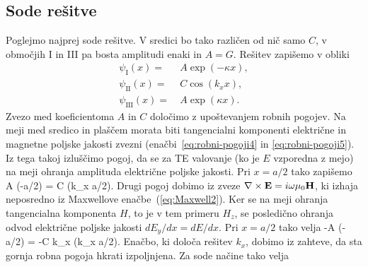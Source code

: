 \subsection*{Sode rešitve}
Poglejmo najprej sode rešitve. V sredici bo tako različen od nič samo $C$, 
v območjih I in III pa bosta amplitudi enaki in $A = G$. Rešitev zapišemo v obliki
\begin{align}
\psi_{\mathrm{I}}(x) =&~ A \exp(-\kappa x), \\
\psi_{\mathrm{II}}(x) =&~ C \cos(k_x x),\\
\psi_{\mathrm{III}}(x) =&~ A \exp(\kappa x).
\end{align}
Zvezo med koeficientoma $A$ in $C$ določimo z upoštevanjem robnih pogojev. Na meji
med sredico in plaščem morata biti tangencialni komponenti 
električne in magnetne poljske jakosti zvezni (enačbi~\ref{eq:robni-pogoji4} in 
\ref{eq:robni-pogoji5}). Iz tega takoj 
izluščimo pogoj, da se za TE valovanje (ko je $E$ vzporedna z mejo) 
na meji ohranja amplituda električne poljske jakosti. Pri $x = a/2$ tako zapišemo
\beq
A \exp(-\kappa a/2) = C \cos(k_x a/2).
\eeq
Drugi pogoj dobimo iz zveze $\nabla\times{\bf E}=i\omega\mu_{0}{\bf H}$, ki izhaja
neposredno iz Maxwellove enačbe~(\ref{eq:Maxwell2}). Ker se na meji ohranja
tangencialna komponenta $H$, to je v tem primeru $H_z$, se posledično ohranja 
odvod električne poljske jakosti $dE_y/dx = dE/dx$. 
Pri $x = a/2$ tako velja
\beq
-A \kappa \exp(-\kappa a/2) = -C k_x \sin(k_x a/2).
\eeq
Enačbo, ki določa rešitev $k_x$, dobimo iz zahteve, da sta gornja robna 
pogoja hkrati izpoljnjena. Za sode načine tako velja

